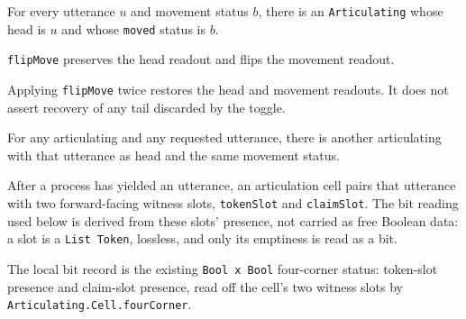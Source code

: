 \begin{theorem}\label{thm:it-move-joint-onto}\leanok{}
For every utterance \(u\) and movement status \(b\), there is an
\texttt{Articulating} whose head is \(u\) and whose \texttt{moved} status is
\(b\).
\end{theorem}

\begin{theorem}\label{thm:move-toggles-it-fixed}\leanok{}
\texttt{flipMove} preserves the head readout and flips the movement readout.
\end{theorem}

\begin{theorem}\label{thm:flip-move-visible-readouts}\leanok{}
Applying \texttt{flipMove} twice restores the head and movement readouts.  It
does not assert recovery of any tail discarded by the toggle.
\end{theorem}

\begin{theorem}\label{thm:it-varies-move-fixed}\leanok{}
For any articulating and any requested utterance, there is another articulating
with that utterance as head and the same movement status.
\end{theorem}

\begin{definition}\label{def:articulation-cell-bits}\leanok{}
After a process has yielded an utterance, an articulation cell pairs that
utterance with two forward-facing witness slots, \texttt{tokenSlot} and
\texttt{claimSlot}. The bit reading used below is derived from these slots'
presence, not carried as free Boolean data: a slot is a \texttt{List Token},
lossless, and only its emptiness is read as a bit.
\end{definition}

\begin{definition}\label{def:articulation-four-corner-bit-record}\leanok{}
The local bit record is the existing \texttt{Bool x Bool} four-corner status:
token-slot presence and claim-slot presence, read off the cell's two witness
slots by \texttt{Articulating.Cell.fourCorner}.
\end{definition}

